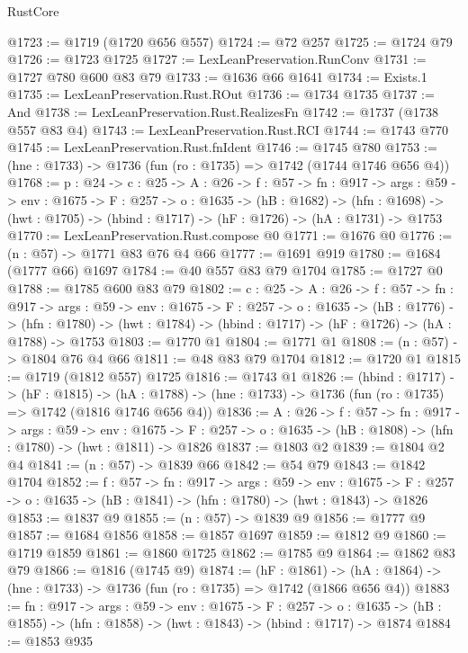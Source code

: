 \begin{lexlean}{RustCore}
\begin{coremodule}
@1723 := @1719 (@1720 @656 @557)
@1724 := @72 @257
@1725 := @1724 @79
@1726 := @1723 @1725
@1727 := LexLeanPreservation.RunConv
@1731 := @1727 @780 @600 @83 @79
@1733 := @1636 @66 @1641
@1734 := Exists.{1}
@1735 := LexLeanPreservation.Rust.ROut
@1736 := @1734 @1735
@1737 := And
@1738 := LexLeanPreservation.Rust.RealizesFn
@1742 := @1737 (@1738 @557 @83 @4)
@1743 := LexLeanPreservation.Rust.RCI
@1744 := @1743 @770
@1745 := LexLeanPreservation.Rust.fnIdent
@1746 := @1745 @780
@1753 := (hne : @1733) -> @1736 (fun (ro : @1735) => @1742 (@1744 @1746 @656 @4))
@1768 := {p : @24} ->
  {c : @25} ->
  {A : @26} ->
  {f : @57} ->
  {fn : @917} ->
  {args : @59} ->
  {env : @1675} ->
  {F : @257} ->
  {o : @1635} ->
  (hB : @1682) ->
  (hfn : @1698) -> (hwt : @1705) -> (hbind : @1717) -> (hF : @1726) -> (hA : @1731) -> @1753
@1770 := LexLeanPreservation.Rust.compose @0
@1771 := @1676 @0
@1776 := (n : @57) -> @1771 @83 @76 @4 @66
@1777 := @1691 @919
@1780 := @1684 (@1777 @66) @1697
@1784 := @40 @557 @83 @79 @1704
@1785 := @1727 @0
@1788 := @1785 @600 @83 @79
@1802 := {c : @25} ->
  {A : @26} ->
  {f : @57} ->
  {fn : @917} ->
  {args : @59} ->
  {env : @1675} ->
  {F : @257} ->
  {o : @1635} ->
  (hB : @1776) ->
  (hfn : @1780) -> (hwt : @1784) -> (hbind : @1717) -> (hF : @1726) -> (hA : @1788) -> @1753
@1803 := @1770 @1
@1804 := @1771 @1
@1808 := (n : @57) -> @1804 @76 @4 @66
@1811 := @48 @83 @79 @1704
@1812 := @1720 @1
@1815 := @1719 (@1812 @557) @1725
@1816 := @1743 @1
@1826 := (hbind : @1717) ->
  (hF : @1815) ->
  (hA : @1788) -> (hne : @1733) -> @1736 (fun (ro : @1735) => @1742 (@1816 @1746 @656 @4))
@1836 := {A : @26} ->
  {f : @57} ->
  {fn : @917} ->
  {args : @59} ->
  {env : @1675} ->
  {F : @257} -> {o : @1635} -> (hB : @1808) -> (hfn : @1780) -> (hwt : @1811) -> @1826
@1837 := @1803 @2
@1839 := @1804 @2 @4
@1841 := (n : @57) -> @1839 @66
@1842 := @54 @79
@1843 := @1842 @1704
@1852 := {f : @57} ->
  {fn : @917} ->
  {args : @59} ->
  {env : @1675} ->
  {F : @257} -> {o : @1635} -> (hB : @1841) -> (hfn : @1780) -> (hwt : @1843) -> @1826
@1853 := @1837 @9
@1855 := (n : @57) -> @1839 @9
@1856 := @1777 @9
@1857 := @1684 @1856
@1858 := @1857 @1697
@1859 := @1812 @9
@1860 := @1719 @1859
@1861 := @1860 @1725
@1862 := @1785 @9
@1864 := @1862 @83 @79
@1866 := @1816 (@1745 @9)
@1874 := (hF : @1861) ->
  (hA : @1864) -> (hne : @1733) -> @1736 (fun (ro : @1735) => @1742 (@1866 @656 @4))
@1883 := {fn : @917} ->
  {args : @59} ->
  {env : @1675} ->
  {F : @257} ->
  {o : @1635} -> (hB : @1855) -> (hfn : @1858) -> (hwt : @1843) -> (hbind : @1717) -> @1874
@1884 := @1853 @935

\end{coremodule}
\end{lexlean}
